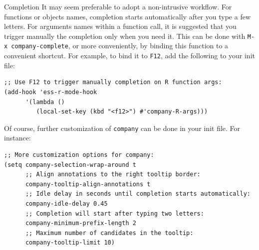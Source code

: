\documentclass[presentation]{beamer}
\begin{document}
\begin{frame}[fragile,allowframebreaks,label=]{Completion}
It may seem preferable to adopt a non-intrusive workflow. For functions or objects names, completion starts automatically after you type a few letters. For arguments names within a function call, it is suggested that you trigger manually the completion only when you need it. This can be done with \texttt{M-x company-complete}, or more conveniently, by binding this function to a convenient shortcut. For example, to bind it to \texttt{F12}, add the following to your init file:

\begin{verbatim}
;; Use F12 to trigger manually completion on R function args:
(add-hook 'ess-r-mode-hook
	  '(lambda ()
	     (local-set-key (kbd "<f12>") #'company-R-args)))
\end{verbatim}

\pagebreak

Of course, further customization of \texttt{company} can be done in your init file. For instance:

\begin{verbatim}
;; More customization options for company:
(setq company-selection-wrap-around t
      ;; Align annotations to the right tooltip border:
      company-tooltip-align-annotations t
      ;; Idle delay in seconds until completion starts automatically:
      company-idle-delay 0.45
      ;; Completion will start after typing two letters:
      company-minimum-prefix-length 2
      ;; Maximum number of candidates in the tooltip:
      company-tooltip-limit 10)
\end{verbatim}
\end{frame}
\end{document}
